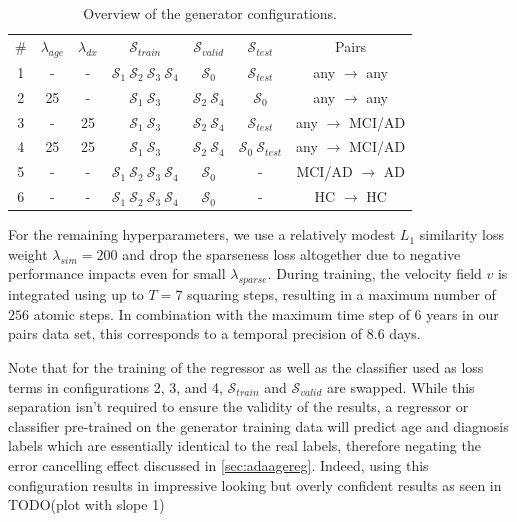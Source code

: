 \begin{table}[h]
	\begin{center}
		\begin{tabular}{c c c c c c c}
			\toprule
			\# & $\lambda_{age}$ & $\lambda_{dx}$ &
				$\mathcal{S}_{train}$ & $\mathcal{S}_{valid}$ & $\mathcal{S}_{test}$ & Pairs \\
			\cmidrule(lr){1-7}
			1 &  - &  - & $\mathcal{S}_1\:\mathcal{S}_2\:\mathcal{S}_3\:\mathcal{S}_4$ &
				      $\mathcal{S}_0$ &
				      $\mathcal{S}_{test}$ &
				      \footnotesize any $\rightarrow$ any \\
			2 & 25 &  - & $\mathcal{S}_1\:\mathcal{S}_3$ & 
				      $\mathcal{S}_2\:\mathcal{S}_4$ &
				      $\mathcal{S}_0$ & 
				      \footnotesize any $\rightarrow$ any \\
			3 &  - & 25 & $\mathcal{S}_1\:\mathcal{S}_3$ & 
				      $\mathcal{S}_2\:\mathcal{S}_4$ &
				      $\mathcal{S}_{test}$ & 
				      \footnotesize any $\rightarrow$ MCI/AD \\
			4 & 25 & 25 & $\mathcal{S}_1\:\mathcal{S}_3$ & 
				      $\mathcal{S}_2\:\mathcal{S}_4$ &
				      $\mathcal{S}_0\:\mathcal{S}_{test}$ &
				      \footnotesize any $\rightarrow$ MCI/AD \\
			5 &  - &  - & $\mathcal{S}_1\:\mathcal{S}_2\:\mathcal{S}_3\:\mathcal{S}_4$ &
				      $\mathcal{S}_0$ &
				      - &
				      \footnotesize MCI/AD $\rightarrow$ AD \\
			6 &  - &  - & $\mathcal{S}_1\:\mathcal{S}_2\:\mathcal{S}_3\:\mathcal{S}_4$ &
				      $\mathcal{S}_0$ &
				      - &
				      \footnotesize HC $\rightarrow$ HC \\
			\bottomrule
		\end{tabular}
		\caption{Overview of the generator configurations.}
		\label{tab:ganconfig}
	\end{center}
\end{table}

For the remaining hyperparameters, we use a relatively modest $L_1$ similarity loss weight $\lambda_{sim} = 200$ and drop the sparseness loss altogether due to negative performance impacts even for small $\lambda_{sparse}$. During training, the velocity field $v$ is integrated using up to $T = 7$ squaring steps, resulting in a maximum number of $256$ atomic steps. In combination with the maximum time step of 6 years in our pairs data set, this corresponds to a temporal precision of 8.6 days.

Note that for the training of the regressor as well as the classifier used as loss terms in configurations 2, 3, and 4, $\mathcal{S}_{train}$ and $\mathcal{S}_{valid}$ are swapped. While this separation isn't required to ensure the validity of the results, a regressor or classifier pre-trained on the generator training data will predict age and diagnosis labels which are essentially identical to the real labels, therefore negating the error cancelling effect discussed in \autoref{sec:adaagereg}. Indeed, using this configuration results in impressive looking but overly confident results as seen in TODO(plot with slope 1)

